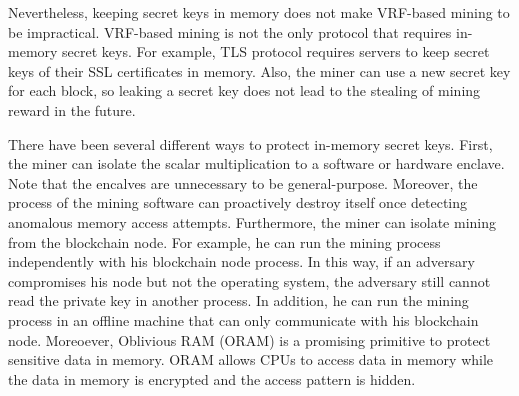 Nevertheless, keeping secret keys in memory does not make VRF-based mining to be impractical.
VRF-based mining is not the only protocol that requires in-memory secret keys.
For example, TLS protocol requires servers to keep secret keys of their SSL certificates in memory.
Also, the miner can use a new secret key for each block, so leaking a secret key does not lead to the stealing of mining reward in the future.

There have been several different ways to protect in-memory secret keys.
First, the miner can isolate the scalar multiplication to a software or hardware enclave. Note that the encalves are unnecessary to be general-purpose. Moreover, the process of the mining software can proactively destroy itself once detecting anomalous memory access attempts.
Furthermore, the miner can isolate mining from the blockchain node.
For example, he can run the mining process independently with his blockchain node process.
In this way, if an adversary compromises his node but not the operating system, the adversary still cannot read the private key in another process.
In addition, he can run the mining process in an offline machine that can only communicate with his blockchain node.
Moreoever, Oblivious RAM (ORAM) is a promising primitive to protect sensitive data in memory.
ORAM allows CPUs to access data in memory while the data in memory is encrypted and the access pattern is hidden.

